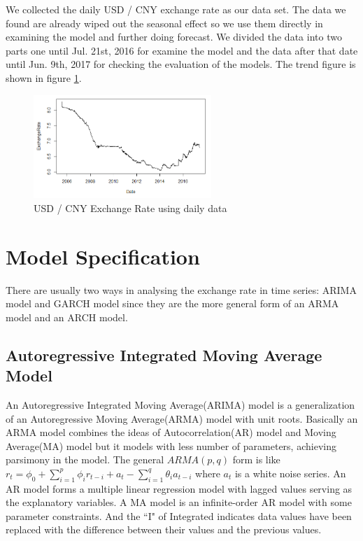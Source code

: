 \documentclass[12pt, a4paper, titlepage]{article}
\begin{document}
We collected the daily USD / CNY exchange rate as our data set. The data we found are already wiped out the seasonal effect so we use them directly in examining the model and further doing forecast. We divided the data into two parts one until Jul. 21st, 2016 for examine the model and the data after that date until Jun. 9th, 2017 for checking the evaluation of the models. The trend figure is shown in figure \ref{daily}.\\
\begin{figure}[h!]
\begin{center}
\caption{USD / CNY Exchange Rate using daily data}\label{daily}
\includegraphics[width=0.6\textwidth]{daily.png} 
\end{center}
\end{figure}

\section{Model Specification}
There are usually two ways in analysing the exchange rate in time series: ARIMA model and GARCH model since they are the more general form of an ARMA model and an ARCH model. 

\subsection{Autoregressive Integrated Moving Average Model}
An Autoregressive Integrated Moving Average(ARIMA) model is a generalization of an Autoregressive Moving Average(ARMA) model with unit roots. Basically an ARMA model combines the ideas of Autocorrelation(AR) model and Moving Average(MA) model but it models with less number of parameters, achieving parsimony in the model. The general $ARMA(p,q)$ form is like $r_t = \phi_0 + \sum_{i=1}^p \phi_i r_{t-i} + a_t - \sum_{i=1}^q \theta_i a_{t-i}$ where ${a_t}$ is a white noise series. An AR model forms a multiple linear regression model with lagged values serving as the explanatory variables. A MA model is an infinite-order AR model with some parameter constraints. And the ``I" of Integrated indicates data values have been replaced with the difference between their values and the previous values.\\
\end{document}
